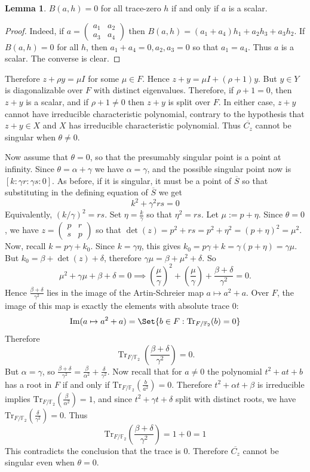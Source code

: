 \documentclass[preprint,11pt]{amsart}
\def\F{\mathbb{F}}
\theoremstyle{definition}
\numberwithin{thm}{section}
\newtheorem{lem}[thm]{Lemma}
\newcommand{\gam}{\gamma}
\newcommand{\Tr}{\operatorname{Tr}}
\newcommand{\trm}[1]{\textrm{#1}}
\newcommand{\al}{\alpha}
\def\F{\mathbb{F}}
\newcommand{\tr}{\textrm{Tr}}
\newcommand{\ol}[1]{\overline{#1}}
\begin{document}
\begin{lem}
$B(a,h) = 0$ for all trace-zero $h$ if and only if $a$ is a scalar.
\end{lem}
\begin{proof}
Indeed, if $a = \begin{pmatrix} a_1 & a_2 \\ a_3 & a_4 \end{pmatrix}$ then $B(a,h) = (a_1 + a_4)h_1 + a_2 h_3 + a_3 h_2$. If $B(a,h) = 0$ for all $h$, then $a_1 + a_4 = 0, a_2, a_3 =0$ so that $a_1 = a_4$. Thus $a$ is a scalar. The converse is clear. 
\end{proof}

Therefore $z + \rho y = \mu I$ for some $\mu \in F$.  Hence $z + y = \mu I + (\rho + 1) y$. But $y \in Y$ is diagonalizable over $F$ with distinct eigenvalues. Therefore, if $\rho + 1 = 0$, then $z + y$ is a scalar, and if $\rho +1 \neq 0$ then $z + y$ is split over $F$. In either case, $z+y$ cannot have irreducible characteristic polynomial, contrary to the hypothesis that  $z + y \in X$ and $X$ has irreducible characteristic polynomial.
Thus $\ol{C_z}$ cannot be singular when $\theta \neq 0$.


Now assume that $\theta = 0$, so that the presumably singular point is a point at infinity. Since $\theta = \al + \gam$ we have $\al = \gam$, and the possible singular point now is $[k: \gam r : \gam s : 0]$. As before, if it is singular, it must be a point of $\ol{S}$ so that substituting in the defining equation of $\ol{S}$ we get
$$
k^2 + \gam^2 rs = 0
$$
Equivalently, $(k/\gam)^2 = rs$. Set $\eta = \frac{k}{\gam}$ so that $\eta^2 = rs$. Let $\mu := p  + \eta$. Since $\theta = 0$, we have $z = \begin{pmatrix} p & r  \\ s & p \end{pmatrix}$ so that $\det(z) = p^2 + rs = p^2 + \eta^2 = (p + \eta)^2  = \mu^2$. Now, recall $k = p \gam + k_0$. Since $k = \gam \eta$, this gives 
$
k_0 = p \gam + k = \gam (p + \eta) = \gam \mu.
$
But $k_0 = \beta + \det(z) + \delta$, therefore $\gam \mu = \beta + \mu^2 + \delta$. So 
$$
\mu^2 + \gam \mu + \beta + \delta = 0 \implies \left( \frac{ \mu}{ \gam } \right)^2 + \left( \frac{\mu}{\gam} \right) + \frac{\beta + \delta}{\gam^2} = 0.
$$
Hence $\frac{\beta + \delta}{\gam^2}$ lies in the image of the Artin-Schreier map $a \mapsto a^2 + a$. Over $F$, the image of this map is exactly the elements with absolute trace $0$:
$$
\trm{Im}(a \mapsto a^2 + a) = \Set{ b \in F : \tr_{F/\F_2}(b) = 0 }
$$
Therefore 
$$
\Tr_{F/\F_2} \left( \frac{\beta + \delta} {\gam^2} \right) = 0.
$$
But $\al = \gam$, so 
$
\frac{\beta + \delta}{\gam^2} = \frac{\beta}{\al^2} + \frac{\delta}{\gam^2}.
$
Now recall that for $a \neq 0$ the polynomial $t^2 + at + b$ has a root in $F$ if and only if $\tr_{F/\F_2} \left( \frac{b}{a^2} \right) = 0$. Therefore $t^2 + \al t + \beta$ is irreducible implies $\tr_{F/\F_2} \left( \frac{\beta}{\al^2} \right) = 1$, and since $t^2 + \gam t + \delta$ split with distinct roots, we have $\tr_{F/\F_2} \left( \frac{\delta}{\gam^2} \right) =0$. Thus 
$$
\tr_{F/\F_2} \left( \frac{\beta + \delta}{\gam^2} \right) = 1 + 0 = 1
$$
This contradicts the conclusion that the trace is $0$. Therefore $\ol{C_z}$ cannot be singular even when $\theta = 0$. 
\end{document}
